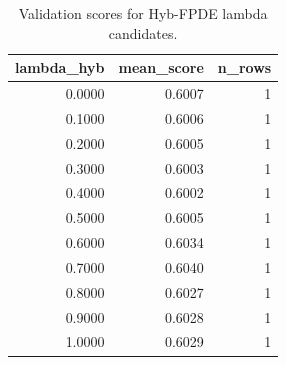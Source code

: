 \begin{table}[t]
\caption{Validation scores for Hyb-FPDE lambda candidates.}
\label{tab:lambda_distribution_computed}
\centering
\begin{tabular}{rrr}
\toprule
lambda\_hyb & mean\_score & n\_rows \\
\midrule
0.0000 & 0.6007 & 1 \\
0.1000 & 0.6006 & 1 \\
0.2000 & 0.6005 & 1 \\
0.3000 & 0.6003 & 1 \\
0.4000 & 0.6002 & 1 \\
0.5000 & 0.6005 & 1 \\
0.6000 & 0.6034 & 1 \\
0.7000 & 0.6040 & 1 \\
0.8000 & 0.6027 & 1 \\
0.9000 & 0.6028 & 1 \\
1.0000 & 0.6029 & 1 \\
\bottomrule
\end{tabular}

\end{table}
